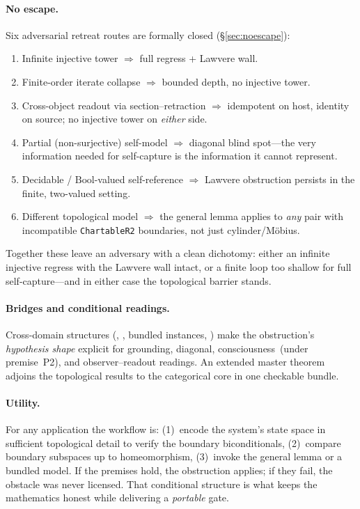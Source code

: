 \documentclass[11pt]{article}
\begin{document}
\paragraph{No escape.}
Six adversarial retreat routes are formally closed
(\S\ref{sec:noescape}):
\begin{enumerate}[label=(\roman*),leftmargin=2em,itemsep=0.15ex,topsep=0.5ex,parsep=0pt]
\item Infinite injective tower $\Rightarrow$ full regress + Lawvere wall.
\item Finite-order iterate collapse $\Rightarrow$ bounded depth, no
  injective tower.
\item Cross-object readout via section--retraction $\Rightarrow$
  idempotent on host, identity on source; no injective tower on
  \emph{either} side.
\item Partial (non-surjective) self-model $\Rightarrow$ diagonal blind
  spot---the very information needed for self-capture is the information
  it cannot represent.
\item Decidable / $\mathrm{Bool}$-valued self-reference $\Rightarrow$
  Lawvere obstruction persists in the finite, two-valued setting.
\item Different topological model $\Rightarrow$ the general lemma
  applies to \emph{any} pair with incompatible \texttt{ChartableR2}
  boundaries, not just cylinder/M\"obius.
\end{enumerate}
Together these leave an adversary with a clean dichotomy: either an
infinite injective regress with the Lawvere wall intact, or a finite
loop too shallow for full self-capture---and in either case the
topological barrier stands.

\paragraph{Bridges and conditional readings.}
Cross-domain structures
(,
,
bundled  instances,
)
make the obstruction's \emph{hypothesis shape} explicit for grounding,
diagonal, consciousness~(under premise~P2), and observer--readout
readings.  An extended master theorem adjoins the topological results
to the categorical core in one checkable bundle.

\paragraph{Utility.}
For any application the workflow is:
(1)~encode the system's state space in sufficient topological detail to
verify the boundary biconditionals,
(2)~compare boundary subspaces up to homeomorphism,
(3)~invoke the general lemma or a bundled model.
If the premises hold, the obstruction applies; if they fail, the
obstacle was never licensed.  That conditional structure is what keeps
the mathematics honest while delivering a \emph{portable} gate.
\end{document}
